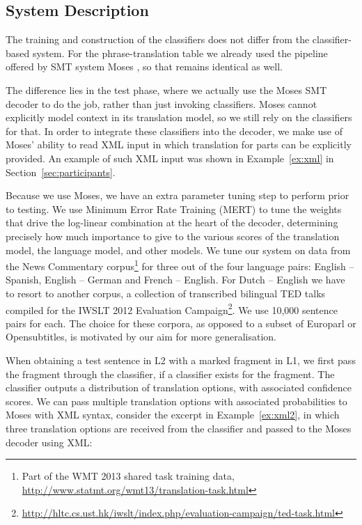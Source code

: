 \subsection{System Description}

The training and construction of the classifiers does not differ from the
classifier-based system. For the phrase-translation table we already used the
pipeline offered by SMT system Moses \citep{MOSES}, so that remains identical as
well.

The difference lies in the test phase, where we actually use the Moses
SMT decoder to do the job, rather than just invoking
classifiers. Moses cannot explicitly model context in its translation
model, so we still rely on the classifiers for that. In order to
integrate these classifiers into the decoder, we make use of Moses'
ability to read XML input in which translation for parts can be
explicitly provided. An example of such XML input was shown in
Example~\ref{ex:xml} in Section~\ref{sec:participants}.

Because we use Moses, we have an extra parameter tuning step to perform prior
to testing. We use Minimum Error Rate Training (MERT) \citep{MERT} to tune the
weights that drive the log-linear combination at the heart of the decoder,
determining precisely how much importance to give to the various scores of the
translation model, the language model, and other models. We tune our system on
data from the News Commentary corpus\footnote{Part of the WMT 2013 shared task
training data, \url{http://www.statmt.org/wmt13/translation-task.html}} for
three out of the four language pairs: English -- Spanish, English -- German and
French -- English. For Dutch -- English we have to resort to another corpus, a
collection of transcribed bilingual TED talks compiled for the IWSLT 2012
Evaluation
Campaign\footnote{\url{http://hltc.cs.ust.hk/iwslt/index.php/evaluation-campaign/ted-task.html}}. 
We use 10,000 sentence pairs for each. The choice for these corpora, as opposed
to a subset of Europarl or Opensubtitles, is motivated by our aim for more
generalisation.

When obtaining a test sentence in L2 with a marked fragment in L1, we first
pass the fragment through the classifier, if a classifier exists for the
fragment. The classifier outputs a distribution of translation
options, with associated confidence scores. We can pass multiple translation
options with associated probabilities to Moses with XML syntax, consider the
excerpt in Example~\ref{ex:xml2}, in which three translation options are
received from the classifier and passed to the Moses decoder using XML:


